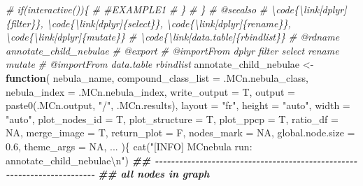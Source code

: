 \documentclass[
]{article}
\newenvironment{Shaded}{\begin{snugshade}}{\end{snugshade}}
\newcommand{\AttributeTok}[1]{\textcolor[rgb]{0.77,0.63,0.00}{#1}}
\newcommand{\CommentTok}[1]{\textcolor[rgb]{0.56,0.35,0.01}{\textit{#1}}}
\newcommand{\ConstantTok}[1]{\textcolor[rgb]{0.00,0.00,0.00}{#1}}
\newcommand{\ControlFlowTok}[1]{\textcolor[rgb]{0.13,0.29,0.53}{\textbf{#1}}}
\newcommand{\DocumentationTok}[1]{\textcolor[rgb]{0.56,0.35,0.01}{\textbf{\textit{#1}}}}
\newcommand{\FloatTok}[1]{\textcolor[rgb]{0.00,0.00,0.81}{#1}}
\newcommand{\FunctionTok}[1]{\textcolor[rgb]{0.00,0.00,0.00}{#1}}
\newcommand{\NormalTok}[1]{#1}
\newcommand{\OtherTok}[1]{\textcolor[rgb]{0.56,0.35,0.01}{#1}}
\newcommand{\SpecialCharTok}[1]{\textcolor[rgb]{0.00,0.00,0.00}{#1}}
\newcommand{\StringTok}[1]{\textcolor[rgb]{0.31,0.60,0.02}{#1}}
\begin{document}
\begin{Shaded}
\begin{Highlighting}[]
\CommentTok{\#\textquotesingle{} if(interactive())\{}
\CommentTok{\#\textquotesingle{}  \#EXAMPLE1}
\CommentTok{\#\textquotesingle{}  \}}
\CommentTok{\#\textquotesingle{} \}}
\CommentTok{\#\textquotesingle{} @seealso }
\CommentTok{\#\textquotesingle{}  \textbackslash{}code\{\textbackslash{}link[dplyr]\{filter\}\}, \textbackslash{}code\{\textbackslash{}link[dplyr]\{select\}\}, \textbackslash{}code\{\textbackslash{}link[dplyr]\{rename\}\}, \textbackslash{}code\{\textbackslash{}link[dplyr]\{mutate\}\}}
\CommentTok{\#\textquotesingle{}  \textbackslash{}code\{\textbackslash{}link[data.table]\{rbindlist\}\}}
\CommentTok{\#\textquotesingle{} @rdname annotate\_child\_nebulae}
\CommentTok{\#\textquotesingle{} @export }
\CommentTok{\#\textquotesingle{} @importFrom dplyr filter select rename mutate}
\CommentTok{\#\textquotesingle{} @importFrom data.table rbindlist}
\NormalTok{annotate\_child\_nebulae }\OtherTok{\textless{}{-}}
  \ControlFlowTok{function}\NormalTok{(}
\NormalTok{           nebula\_name,}
           \AttributeTok{compound\_class\_list =}\NormalTok{ .MCn.nebula\_class,}
           \AttributeTok{nebula\_index =}\NormalTok{ .MCn.nebula\_index,}
           \AttributeTok{write\_output =}\NormalTok{ T,}
           \AttributeTok{output =} \FunctionTok{paste0}\NormalTok{(.MCn.output, }\StringTok{"/"}\NormalTok{, .MCn.results),}
           \AttributeTok{layout =} \StringTok{"fr"}\NormalTok{,}
           \AttributeTok{height =} \StringTok{"auto"}\NormalTok{,}
           \AttributeTok{width =} \StringTok{"auto"}\NormalTok{,}
           \AttributeTok{plot\_nodes\_id =}\NormalTok{ T,}
           \AttributeTok{plot\_structure =}\NormalTok{ T,}
           \AttributeTok{plot\_ppcp =}\NormalTok{ T,}
           \AttributeTok{ratio\_df =} \ConstantTok{NA}\NormalTok{,}
           \AttributeTok{merge\_image =}\NormalTok{ T,}
           \AttributeTok{return\_plot =}\NormalTok{ F,}
           \AttributeTok{nodes\_mark =} \ConstantTok{NA}\NormalTok{,}
           \AttributeTok{global.node.size =} \FloatTok{0.6}\NormalTok{,}
           \AttributeTok{theme\_args =} \ConstantTok{NA}\NormalTok{,}
\NormalTok{           ...}
\NormalTok{           )\{}
    \FunctionTok{cat}\NormalTok{(}\StringTok{"[INFO] MCnebula run: annotate\_child\_nebulae}\SpecialCharTok{\textbackslash{}n}\StringTok{"}\NormalTok{)}
    \DocumentationTok{\#\# {-}{-}{-}{-}{-}{-}{-}{-}{-}{-}{-}{-}{-}{-}{-}{-}{-}{-}{-}{-}{-}{-}{-}{-}{-}{-}{-}{-}{-}{-}{-}{-}{-}{-}{-}{-}{-}{-}{-}{-}{-}{-}{-}{-}{-}{-}{-}{-}{-}{-}{-}{-}{-}{-}{-}{-}{-}{-}{-}{-}{-}{-}{-}{-}{-}{-}{-}{-}{-}{-}{-}{-}}
    \DocumentationTok{\#\# all nodes in graph}

\end{Highlighting}
\end{Shaded}
\end{document}
